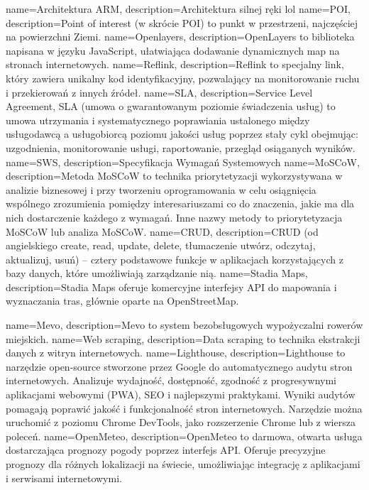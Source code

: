 {
    name={Architektura ARM},
    description={Architektura silnej ręki lol}
}
{
    name={POI},
    description={Point of interest (w skrócie POI) to punkt w przestrzeni, najczęściej na powierzchni Ziemi.}
}
{
    name={Openlayers},
    description={OpenLayers to biblioteka napisana w języku JavaScript, ułatwiająca dodawanie dynamicznych map na stronach internetowych.}
}
{
    name={Reflink},
    description={Reflink to specjalny link, który zawiera unikalny kod identyfikacyjny, pozwalający na monitorowanie ruchu i przekierowań z innych źródeł.}
}
{
    name={SLA},
    description={Service Level Agreement, SLA (umowa o gwarantowanym poziomie świadczenia usług) to umowa utrzymania i systematycznego poprawiania ustalonego między usługodawcą a usługobiorcą poziomu jakości usług poprzez stały cykl obejmując: uzgodnienia,
    monitorowanie usługi, raportowanie, przegląd osiąganych wyników.}
}
{
    name={SWS},
    description={Specyfikacja Wymagań Systemowych }
}
{
    name={MoSCoW},
    description={Metoda MoSCoW to technika priorytetyzacji wykorzystywana w analizie biznesowej i przy tworzeniu oprogramowania w celu osiągnięcia wspólnego zrozumienia pomiędzy interesariuszami co do znaczenia, jakie ma dla nich dostarczenie każdego z wymagań. Inne nazwy metody to priorytetyzacja MoSCoW lub analiza MoSCoW.}
}
{
    name={CRUD},
    description={CRUD (od angielskiego create, read, update, delete, tłumaczenie utwórz, odczytaj, aktualizuj, usuń) – cztery podstawowe funkcje w aplikacjach korzystających z bazy danych, które umożliwiają zarządzanie nią.}
}
{
    name={Stadia Maps},
    description={Stadia Maps oferuje komercyjne interfejsy API do mapowania i wyznaczania tras, głównie oparte na OpenStreetMap.}
}

{
    name={Mevo},
    description={Mevo to system bezobsługowych wypożyczalni rowerów miejskich.}
}
{
    name={Web scraping},
    description={Data scraping to technika ekstrakcji danych z witryn internetowych.}
}
{
    name={Lighthouse},
description={Lighthouse to narzędzie open-source stworzone przez Google do automatycznego audytu stron internetowych. Analizuje wydajność, dostępność, zgodność z progresywnymi aplikacjami webowymi (PWA), SEO i najlepszymi praktykami. Wyniki audytów pomagają poprawić jakość i funkcjonalność stron internetowych. Narzędzie można uruchomić z poziomu Chrome DevTools, jako rozszerzenie Chrome lub z wiersza poleceń.}
}
{
    name={OpenMeteo},
description={OpenMeteo to darmowa, otwarta usługa dostarczająca prognozy pogody poprzez interfejs API. Oferuje precyzyjne prognozy dla różnych lokalizacji na świecie, umożliwiając integrację z aplikacjami i serwisami internetowymi.}
}
